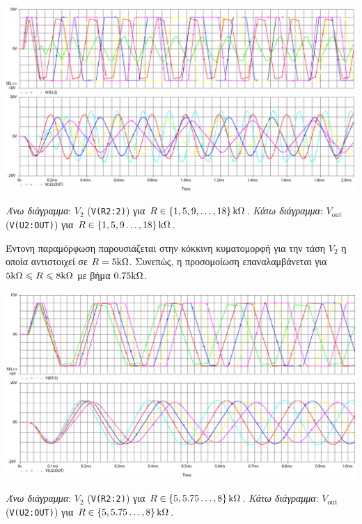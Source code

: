\begin{chart}[H]
	\begin{center}
		\includegraphics[width=15cm]{spice_01/q5_2.pdf}
		\caption{\textsl{Άνω διάγραμμα}: $V_2$ (\texttt{V(R2:2)}) για $R\in\left\{1,5,9,\ldots,18\right\}\kohm$. \textsl{Κάτω διάγραμμα}: $V_{\mathrm{out}}$ (\texttt{V(U2:OUT)}) για $R\in\left\{1,5,9\ldots,18\right\}\kohm$.}
		\label{plot:ask1:q5_2}
	\end{center}
\end{chart}

Έντονη παραμόρφωση παρουσιάζεται στην κόκκινη κυματομορφή για την τάση $V_2$ η οποία αντιστοιχεί σε $R=5\kohm$. Συνεπώς, η προσομοίωση επαναλαμβάνεται για $5\kohm\leqslant R\leqslant 8\kohm$ με βήμα $0.75\kohm$.

\begin{chart}[H]
	\begin{center}
		\includegraphics[width=15cm]{spice_01/q5_3.pdf}
		\caption{\textsl{Άνω διάγραμμα}: $V_2$ (\texttt{V(R2:2)}) για $R\in\left\{5,5.75\ldots,8\right\}\kohm$. \textsl{Κάτω διάγραμμα}: $V_{\mathrm{out}}$ (\texttt{V(U2:OUT)}) για $R\in\left\{5,5.75\ldots,8\right\}\kohm$.}
		\label{plot:ask1:q5_3}
	\end{center}
\end{chart}

